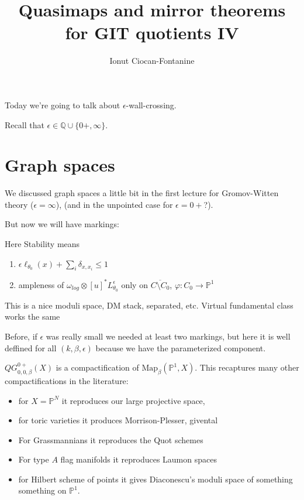\documentclass{amsart}
\title{Quasimaps and mirror theorems for GIT quotients IV}
\author{Ionut Ciocan-Fontanine}
\theoremstyle{definition}
\newcommand{\proj}{\mathbb{P}}
\newcommand{\Q}{\mathbb{Q}}
\begin{document}
\maketitle

Today we're going to talk about $\epsilon$-wall-crossing.

Recall that $\epsilon\in\Q\cup\{0+,\infty\}$.

\section{Graph spaces}
We discussed graph spaces a little bit in the first lecture for Gromov-Witten theory ($\epsilon=\infty$), (and in the unpointed case for $\epsilon=0+$?).

But now we will have markings:


Here Stability means
\begin{enumerate}
\item $\epsilon\ell_{\theta_0}(x)+\sum_{i}\delta_{x,x_i}\leq 1$
\item ampleness of $\omega_{log}\otimes[u]^*L_{\theta_0}^\epsilon$ only on $\overline{C\setminus C_0}$, $\varphi:C_0\to \proj^1$
\end{enumerate}

This is a nice moduli space, DM stack, separated, etc.  Virtual fundamental class works the same 

Before, if $\epsilon$ was really small we needed at least two markings, but here it is well deffined for all $(k,\beta,\epsilon)$ because we have the parameterized component.

$QG^{0+}_{0,0,\beta}(X)$ is a compactification of $\text{Map}_\beta(\proj^1,X)$.  
This recaptures many other compactifications in the literature:

\begin{itemize}

\item for $X=\proj^N$ it reproduces our large projective space, 
\item for toric varieties it produces Morrison-Plesser, givental
\item For Grassmannians it reproduces the Quot schemes
\item For type $A$ flag manifolds it reproduces Laumon spaces
\item for Hilbert scheme of points it gives Diaconescu's moduli space of something something on $\proj^1$.
\end{itemize}
\end{document}
